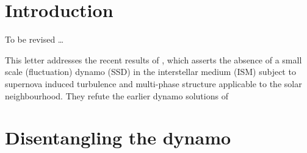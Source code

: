 \documentclass[preprint2]{aastex63}
\begin{document}

\section{Introduction} \label{sec:intro}


To be revised \ldots

This letter addresses the recent results of \citet{GE20}, which asserts the 
absence of a small scale (fluctuation) dynamo (SSD) in the interstellar medium
(ISM) subject to supernova induced turbulence and multi-phase structure
applicable to the solar neighbourhood. 
They refute the earlier dynamo solutions of \citet{BKMM04}

\section{Disentangling the dynamo} \label{sec:ssd-tang}
\end{document}
